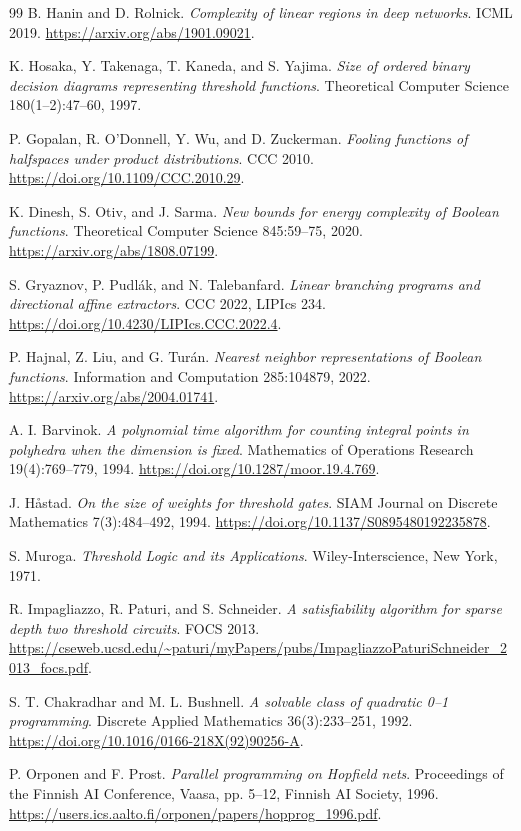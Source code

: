 \documentclass[11pt]{article}
\theoremstyle{definition}
\begin{document}
\begin{thebibliography}{99}
B. Hanin and D. Rolnick.
\emph{Complexity of linear regions in deep networks}.
ICML 2019.
\url{https://arxiv.org/abs/1901.09021}.

K. Hosaka, Y. Takenaga, T. Kaneda, and S. Yajima.
\emph{Size of ordered binary decision diagrams representing threshold functions}.
Theoretical Computer Science 180(1--2):47--60, 1997.

P. Gopalan, R. O'Donnell, Y. Wu, and D. Zuckerman.
\emph{Fooling functions of halfspaces under product distributions}.
CCC 2010.
\url{https://doi.org/10.1109/CCC.2010.29}.

K. Dinesh, S. Otiv, and J. Sarma.
\emph{New bounds for energy complexity of Boolean functions}.
Theoretical Computer Science 845:59--75, 2020.
\url{https://arxiv.org/abs/1808.07199}.

S. Gryaznov, P. Pudl\'ak, and N. Talebanfard.
\emph{Linear branching programs and directional affine extractors}.
CCC 2022, LIPIcs 234.
\url{https://doi.org/10.4230/LIPIcs.CCC.2022.4}.

P. Hajnal, Z. Liu, and G. Tur\'an.
\emph{Nearest neighbor representations of Boolean functions}.
Information and Computation 285:104879, 2022.
\url{https://arxiv.org/abs/2004.01741}.

A. I. Barvinok.
\emph{A polynomial time algorithm for counting integral points in polyhedra when the dimension is fixed}.
Mathematics of Operations Research 19(4):769--779, 1994.
\url{https://doi.org/10.1287/moor.19.4.769}.

J. H{\aa}stad.
\emph{On the size of weights for threshold gates}.
SIAM Journal on Discrete Mathematics 7(3):484--492, 1994.
\url{https://doi.org/10.1137/S0895480192235878}.

S. Muroga.
\emph{Threshold Logic and its Applications}.
Wiley-Interscience, New York, 1971.

R. Impagliazzo, R. Paturi, and S. Schneider.
\emph{A satisfiability algorithm for sparse depth two threshold circuits}.
FOCS 2013.
\url{https://cseweb.ucsd.edu/~paturi/myPapers/pubs/ImpagliazzoPaturiSchneider_2013_focs.pdf}.

S. T. Chakradhar and M. L. Bushnell.
\emph{A solvable class of quadratic 0--1 programming}.
Discrete Applied Mathematics 36(3):233--251, 1992.
\url{https://doi.org/10.1016/0166-218X(92)90256-A}.

P. Orponen and F. Prost.
\emph{Parallel programming on Hopfield nets}.
Proceedings of the Finnish AI Conference, Vaasa, pp. 5--12, Finnish AI Society, 1996.
\url{https://users.ics.aalto.fi/orponen/papers/hopprog_1996.pdf}.
\end{thebibliography}
\end{document}
